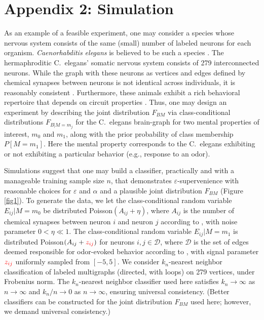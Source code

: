 \documentclass{article}
\newcommand{\mD}{\mathcal{D}}
\providecommand{\tr}[1]{\textcolor{red}{#1}}
\begin{document}
\section*{Appendix 2: Simulation} \label{simulation}

As an example of a feasible experiment, one may consider a species whose nervous system consists of the same (small) number of labeled neurons for each organism. {\it Caenorhabditis elegans} is believed to be such a species \cite{Durbin87}. The hermaphroditic C.~elegans' somatic nervous system consists of 279 interconnected neurons. While the graph with these neurons as vertices and edges defined by chemical synapses between neurons is not identical across individuals, it is reasonably consistent \cite{Durbin87}. Furthermore, these animals exhibit a rich behavioral repertoire that depends on circuit properties \cite{deBonoMaricq05}. Thus, one may design an experiment by describing the joint distribution $F_{BM}$ via class-conditional distributions $F_{B|M=m_j}$ for the C.~elegans brain-graph for two mental properties of interest, $m_0$ and $m_1$, along with the prior probability of class membership $P[M=m_1]$. Here the mental property corresponds to the C.~elegans exhibiting or not exhibiting a particular behavior (e.g., response to an odor).

Simulations suggest that one may build a classifier, practically and with a manageable training sample size $n$, that demonstrates $\varepsilon$-supervenience with reasonable choices for $\varepsilon$ and $\alpha$ and a plausible joint distribution $F_{BM}$ (Figure \ref{fig1}). To generate the data, we let the class-conditional random variable $E_{ij} | M=m_0$ be distributed Poisson$(A_{ij}+\eta)$, where $A_{ij}$ is the number of chemical synapses between neuron $i$ and neuron $j$ according to \cite{VarshneyChklovskii09}, with noise parameter $0<\eta \ll 1$. The class-conditional random variable $E_{ij} | M=m_1$ is distributed Poisson$(A_{ij}+ \tr{z_{ij}})$ for neurons $i,j \in \mD$, where $\mD$ is the set of edges deemed responsible for odor-evoked behavior according to \cite{ChalasaniBargmann07}, with signal parameter $\tr{z_{ij}}$ uniformly sampled from $[-5,5]$. We consider $k_n$-nearest neighbor classification of labeled multigraphs (directed, with loops) on 279 vertices, under Frobenius norm. The $k_n$-nearest neighbor classifier used here satisfies $k_n \rightarrow \infty$ as $n \rightarrow \infty$ and $k_n/n \rightarrow 0$ as $n \rightarrow \infty$, ensuring universal consistency. (Better classifiers can be constructed for the joint distribution $F_{BM}$ used here; however, we demand universal consistency.)
\end{document}
